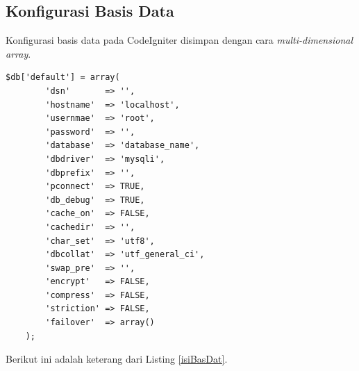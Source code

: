 	\subsection{Konfigurasi Basis Data}
	\label{sub: databaseConf}
	
	Konfigurasi basis data pada CodeIgniter disimpan dengan cara \textit{multi-dimensional array}.
	
	\begin{lstlisting}[caption=Array Basis Data, label=isiBasDat]
$db['default'] = array(
		'dsn'		=> '',
		'hostname'	=> 'localhost',
		'usernmae'	=> 'root',
		'password'	=> '',
		'database'	=> 'database_name',
		'dbdriver'	=> 'mysqli',
		'dbprefix'	=> '',
		'pconnect'	=> TRUE,
		'db_debug'	=> TRUE,
		'cache_on'	=> FALSE,
		'cachedir'	=> '',
		'char_set'	=> 'utf8',
		'dbcollat'	=> 'utf_general_ci',
		'swap_pre'	=> '',
		'encrypt'	=> FALSE,
		'compress'	=> FALSE,
		'striction'	=> FALSE,
		'failover'	=> array()
	);
	\end{lstlisting}
	\pagebreak
	Berikut ini adalah keterang dari Listing \ref{isiBasDat}.
